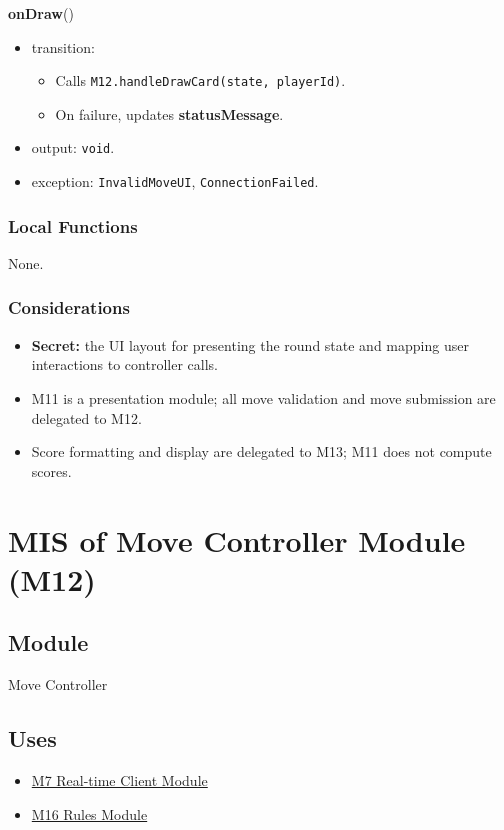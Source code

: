 \documentclass[12pt, titlepage]{article}
\begin{document}
\noindent\textbf{onDraw}()
\begin{itemize}
    \item transition:
    \begin{itemize}
        \item Calls \texttt{M12.handleDrawCard(state, playerId)}.
        \item On failure, updates \textbf{statusMessage}.
    \end{itemize}
    \item output: \texttt{void}.
    \item exception: \texttt{InvalidMoveUI}, \texttt{ConnectionFailed}.
\end{itemize}

\subsubsection{Local Functions}
None.

\subsubsection{Considerations}
\begin{itemize}
    \item \textbf{Secret:} the UI layout for presenting the round state and mapping user interactions to controller calls.
    \item M11 is a presentation module; all move validation and move submission are delegated to M12.
    \item Score formatting and display are delegated to M13; M11 does not compute scores.
\end{itemize}


\newpage
\section{MIS of Move Controller Module (M12)}\label{sec:move-controller-module}

\subsection{Module}
Move Controller

\subsection{Uses}
\begin{itemize}
    \item \hyperref[sec:realtime-client-module]{M7 Real-time Client Module}
    \item \hyperref[sec:rules-module]{M16 Rules Module}
\end{itemize}
\end{document}
